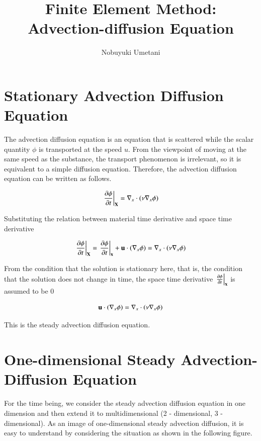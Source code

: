 

\title{Finite Element Method:\\ Advection-diffusion Equation}
\author{Nobuyuki Umetani}


\maketitle
\tableofcontents

\section{Stationary Advection Diffusion Equation}


The advection diffusion equation is an equation that is scattered while the scalar quantity $\phi$ is transported at the speed $u$.
From the viewpoint of moving at the same speed as the substance, the transport phenomenon is irrelevant, so it is equivalent to a simple diffusion equation. Therefore, the advection diffusion equation can be written as follows.

\begin{equation}
 \left.\frac{\partial\phi}{\partial t}\right|_{\mathbf{X}} = \nabla_x \cdot (\nu\nabla_x\phi)
\end{equation}

Substituting the relation between material time derivative and space time derivative

\begin{equation}
 \left.\frac{\partial\phi}{\partial t}\right|_{\mathbf{X}} = \left.\frac{\partial\phi}{\partial t}\right|_{\mathbf{x}} + {\mathbf{u}}\cdot(\nabla_x\phi) = \nabla_x \cdot (\nu\nabla_x\phi)
\end{equation}

From the condition that the solution is stationary here, that is, the condition that the solution does not change in time, the space time derivative $\left.\frac{\partial\phi}{\partial t}\right|_{\mathbf{x}}$ is assumed to be 0

\begin{equation}
 {\mathbf{u}}\cdot(\nabla_x\phi) = \nabla_x \cdot (\nu\nabla_x\phi)
\end{equation}

This is the steady advection diffusion equation.


\section{One-dimensional Steady Advection-Diffusion Equation}
For the time being, we consider the steady advection diffusion equation in one dimension and then extend it to multidimensional (2 - dimensional, 3 - dimensional).
As an image of one-dimensional steady advection diffusion, it is easy to understand by considering the situation as shown in the following figure.


